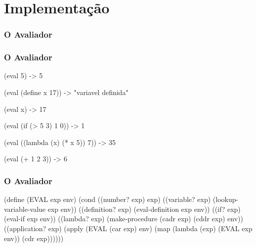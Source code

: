 
\section{Implementação}

\begin{frame}[fragile]
  \frametitle{O Avaliador}
\end{frame}

\begin{frame}[fragile]
  \frametitle{O Avaliador}
    \begin{code}
      (eval 5) -> 5
    \end{code}
    \pause
    \begin{code}
      (eval (define x 17)) -> "variavel definida"
    \end{code}
    \pause
    \begin{code}
      (eval x) -> 17
    \end{code}
    \pause
    \begin{code}
      (eval (if (> 5 3) 1 0)) -> 1
    \end{code}
    \pause
    \begin{code}
      (eval ((lambda (x) (* x 5)) 7)) -> 35
    \end{code}
    \pause
    \begin{code}
      (eval (+ 1 2 3)) -> 6
    \end{code}
\end{frame}

\begin{frame}[fragile]
  \frametitle{O Avaliador}
  \begin{code}
(define (EVAL exp env)
  (cond
    ((number? exp)      exp)
    ((variable? exp)    (lookup-variable-value exp env))
    ((definition? exp)  (eval-definition exp env))
    ((if? exp)          (eval-if exp env))
    ((lambda? exp)      (make-procedure (cadr exp)
                                        (cddr exp) env))
    ((application? exp) (apply (EVAL (car exp) env)
                               (map (lambda (exp)
                                            (EVAL exp env))
                                    (cdr exp))))))
  \end{code}
\end{frame}